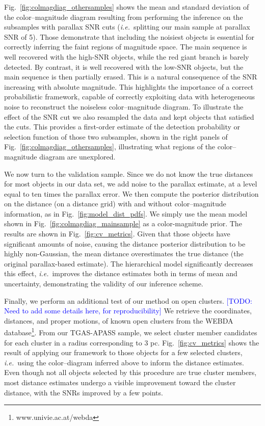 \documentclass[manuscript, letterpaper]{aastex6}
\newcommand{\ie}{{\textit{i.e.}~}}
\newcommand{\figref}[1]{{\xspace}Fig.~\ref{#1}}
\newcommand{\todo}[1]{\textcolor{blue}{[TODO: #1]}}
\begin{document}
\figref{fig:colmagdiag_othersamples} shows the mean and standard deviation of the color--magnitude diagram resulting from performing the inference on the subsamples with parallax SNR cuts (\ie splitting our main sample at parallax SNR of 5). 
Those demonstrate that including the noisiest objects is essential for correctly inferring the faint regions of magnitude space.
The main sequence is well recovered with the high-SNR objects, while the red giant branch is barely detected. 
By contrast, it is well recovered with the low-SNR objects, but the main sequence is then partially erased.
This is a natural consequence of the SNR increasing with absolute magnitude.
This highlights the importance of a correct probabilistic framework, capable of correctly exploiting data with heterogeneous noise to reconstruct the noiseless color--magnitude diagram.
To illustrate the effect of the SNR cut we also resampled the data and kept objects that satisfied the cuts.
This provides a first-order estimate of the detection probability or selection function of those two subsamples, shown in the right panels of \figref{fig:colmagdiag_othersamples}, illustrating what regions of the color--magnitude diagram are unexplored.

We now turn to the validation sample. 
Since we do not know the true distances for most objects in our data set, we add noise to the parallax estimate, at a level equal to ten times the parallax error. 
We then compute the posterior distribution on the distance (on a distance grid) with and without color--magnitude information, as in \figref{fig:model_dist_pdfs}. 
We simply use the mean model shown in \figref{fig:colmagdiag_mainsample} as a color-magnitude prior. 
The results are shown in \figref{fig:cv_metrics}.
Given that those objects have significant amounts of noise, causing the distance posterior distribution to be highly non-Gaussian, the mean distance overestimates the true distance (the original parallax-based estimate). 
The hierarchical model significantly decreases this effect, \ie improves the distance estimates both in terms of mean and uncertainty, demonstrating the validity of our inference scheme.

Finally, we perform an additional test of our method on open clusters.
\todo{Need to add some details here, for reproducibility}
We retrieve the coordinates, distances, and proper motions, of known open clusters from the WEBDA database\footnote{www.univie.ac.at/webda}.
From our TGAS-APASS sample, we select cluster member candidates for each cluster in a radius corresponding to 3 pc.
\figref{fig:cv_metrics} shows the result of applying our framework to those objects for a few selected clusters, \ie using the color--diagram inferred above to inform the distance estimates.
Even though not all objects selected by this procedure are true cluster members, most distance estimates undergo a visible improvement toward the cluster distance, with the SNRs improved by a few points.
\end{document}
